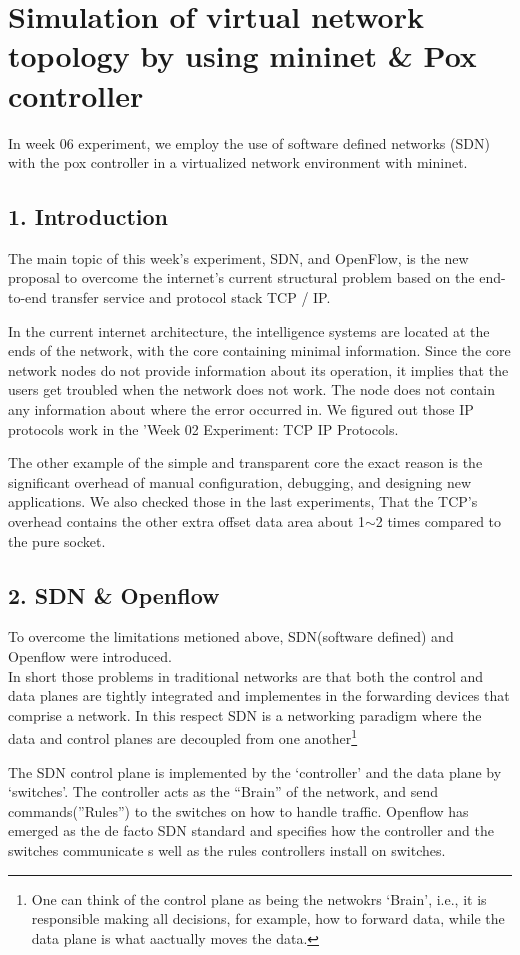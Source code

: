 \section*{Simulation of virtual network topology by using mininet \& Pox controller}
In week 06 experiment, we employ the use of software defined networks (SDN) with the pox controller in a virtualized network environment with mininet.
\subsection*{1. Introduction}
The main topic of this week's experiment, SDN, and OpenFlow, is the new proposal to overcome the internet's current structural problem based on the end-to-end transfer service and protocol stack TCP / IP.

In the current internet architecture, the intelligence systems are located at the ends of the network, with the core containing minimal information.
Since the core network nodes do not provide information about its operation, it implies that the users get troubled when the network does not work. The node does not contain any information about where the error occurred in. We figured out those IP protocols work in the 'Week 02 Experiment: TCP IP Protocols.

The other example of the simple and transparent core the exact reason is the significant overhead of manual configuration, debugging, and designing new applications. We also checked those in the last experiments, That the TCP's overhead contains the other extra offset data area about 1$\sim$2 times compared to the pure socket.

\subsection*{2. SDN \& Openflow}
To overcome the limitations metioned above, SDN(software defined) and Openflow were introduced.\\
In short those problems in traditional networks are that both the control and data planes are tightly integrated and implementes in the forwarding devices that comprise a network. In this respect SDN is a networking paradigm where the data and control planes are decoupled from one another\footnote{One can think of the control plane as being the netwokrs ‘Brain’, i.e., it is responsible making all decisions, for example, how to forward data, while the data plane is what aactually moves the data.} 

The SDN control plane is implemented by the ‘controller’ and the data plane by ‘switches’. The controller acts as the “Brain” of the network, and send commands(”Rules”) to the switches on how to handle traffic. 
Openflow has emerged as the de facto SDN standard and specifies how the controller and the switches communicate s well as the rules controllers install on switches.

